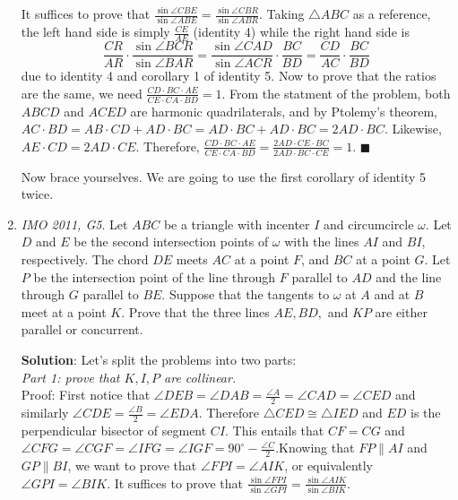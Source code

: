 \documentclass[11pt,a4paper]{article}
\begin{document}
\begin{enumerate}
 It suffices to prove that $\frac{\sin\angle CBE}{\sin\angle ABE}=\frac{\sin\angle CBR}{\sin\angle ABR}$. Taking $\triangle ABC$ as a reference, the left hand side is simply $\frac{CE}{AE}$ (identity 4) while the right hand side is $$\frac{CR}{AR}\cdot\frac{\sin\angle BCR}{\sin\angle BAR}=\frac{\sin\angle CAD}{\sin\angle ACR}\cdot\frac{BC}{BD}=\frac{CD}{AC}\cdot\frac{BC}{BD}$$ due to identity 4 and corollary 1 of identity 5. Now to prove that the ratios are the same, we need $\frac{CD\cdot BC\cdot AE}{CE\cdot CA\cdot BD}=1$.  From the statment of the problem, both $ABCD$ and $ACED$ are harmonic quadrilaterals, and by Ptolemy's theorem, $AC\cdot BD=AB\cdot CD+AD\cdot BC=AD\cdot BC+AD\cdot BC=2AD\cdot BC.$  Likewise, $AE\cdot CD=2AD\cdot CE.$ Therefore, $\frac{CD\cdot BC\cdot AE}{CE\cdot CA\cdot BD}=\frac{2AD\cdot CE\cdot BC}{2AD\cdot BC\cdot CE}=1.$ $\blacksquare$

Now brace yourselves. We are going to use the first corollary of identity 5 twice.
\item \emph{IMO 2011, G5}. Let $ABC$ be a triangle with incenter $I$ and circumcircle $\omega$. Let $D$ and $E$ be the second intersection points of $\omega$ with the lines $AI$ and $BI$, respectively. The chord $DE$ meets $AC$ at a point $F$, and $BC$ at a point $G$. Let $P$ be the intersection point of the line through $F$ parallel to $AD$ and the line through $G$ parallel to $BE$. Suppose that the tangents to $\omega$ at $A$ and at $B$ meet at a point $K$. Prove that the three lines $AE, BD,$ and $KP$ are either parallel or concurrent.

\textbf {Solution}: Let's split the problems into two parts:
\\ \emph{Part 1: prove that $K, I, P$ are collinear.}
\\Proof: First notice that $\angle DEB=\angle DAB=\frac{\angle A}{2}=\angle CAD=\angle CED$ and similarly $\angle CDE=\frac{\angle B}{2}=\angle EDA$. Therefore $\triangle CED\cong\triangle IED$ and $ED$ is the perpendicular bisector of segment $CI$. This entails that $CF=CG$ and $\angle CFG=\angle CGF=\angle IFG=\angle IGF=90^{\circ}-\frac{\angle C}{2}.$Knowing that $FP\parallel AI$ and $GP\parallel BI$, we want to prove that $\angle FPI=\angle AIK$, or equivalently $\angle GPI=\angle BIK$. It suffices to prove that $\frac{\sin\angle FPI}{\sin\angle GPI}=\frac{\sin\angle AIK}{\sin\angle BIK}$.


\end{enumerate}
\end{document}
